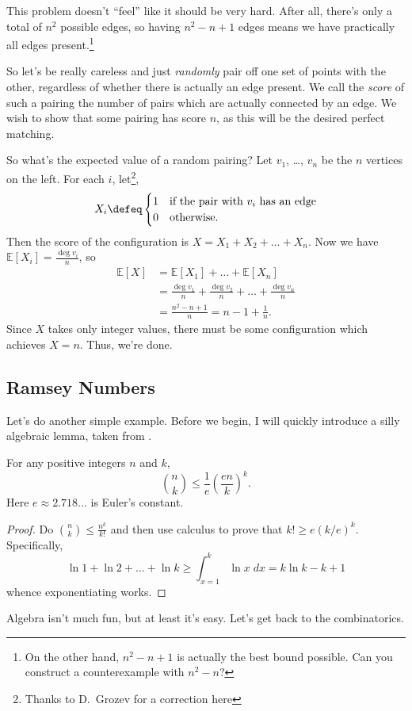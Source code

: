 \documentclass[11pt]{scrartcl}
\newcommand\EE{\mathbb E}
\begin{document}
This problem doesn't ``feel'' like it should be very hard.
After all, there's only a total of $n^2$ possible edges,
so having $n^2-n+1$ edges means we have practically all edges present.\footnote{On the other hand, $n^2-n+1$ is actually the best bound possible. Can you construct a counterexample with $n^2-n$?}

So let's be really careless and just \emph{randomly} pair off one set of points with the other,
regardless of whether there is actually an edge present.
We call the \emph{score} of such a pairing the number of pairs which are actually connected by an edge.
We wish to show that some pairing has score $n$, as this will be the desired perfect matching.

So what's the expected value of a random pairing?
Let $v_1$, \dots, $v_n$ be the $n$ vertices on the left.
For each $i$, let\footnote{Thanks to D.\ Grozev for a correction here},
\[
  X_i \defeq
  \begin{cases}
    1 & \text{if the pair with $v_i$ has an edge} \\
    0 & \text{otherwise}.
  \end{cases}
\]
Then the score of the configuration is $X = X_1 + X_2 + \dots + X_n$.
Now we have $\EE[X_i] = \frac{\deg v_i}{n}$, so
\begin{align*}
  \EE[X] &= \EE[X_1] + \dots + \EE[X_n] \\
  &= \frac{\deg v_1}{n} + \frac{\deg v_2}{n} + \dots + \frac{\deg v_n}{n} \\
  &= \frac{n^2-n+1}{n} = n-1 + \frac 1n.
\end{align*}
Since $X$ takes only integer values,
there must be some configuration which achieves $X=n$.
Thus, we're done.

\subsection{Ramsey Numbers}
Let's do another simple example. Before we begin, I will quickly introduce a silly algebraic lemma,
taken from \cite[page 30]{holden}.
\begin{lemma}
  For any positive integers $n$ and $k$,
  \[ \binom nk \le \frac 1e \left( \frac{en}{k} \right)^k. \]
  Here $e \approx 2.718\dots$ is Euler's constant.
  \label{lem:binom_bound}
\end{lemma}
\begin{proof}
  Do $\binom nk \le \frac{n^k}{k!}$ and then use calculus to prove that
  $k! \ge e(k/e)^k$. Specifically,
  \[ \ln 1 + \ln 2 + \dots + \ln k \ge \int_{x=1}^k \ln x \; dx = k \ln k - k + 1 \]
  whence exponentiating works.
\end{proof}
Algebra isn't much fun, but at least it's easy. Let's get back to the combinatorics.
\end{document}
